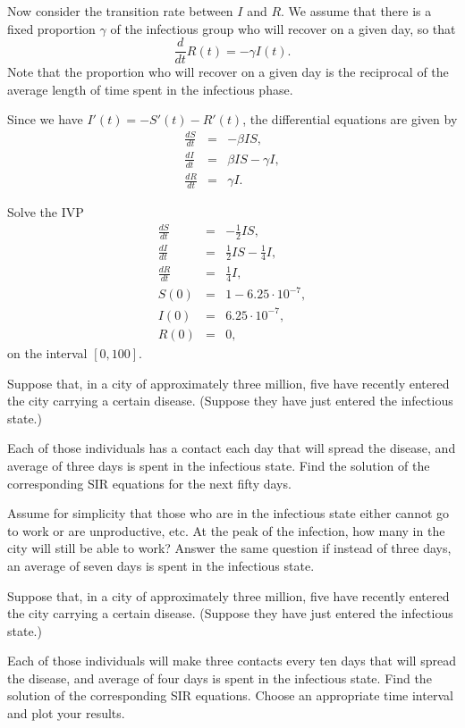  Now consider the transition rate between $I$ and $R$. We assume that there is a fixed proportion $\gamma$ of the infectious group who will recover on a given day, so that 
 \[\frac{d}{dt}R(t) = -\gamma I(t).\]
 Note that the proportion who will recover on a given day is the reciprocal of the average length of time spent in the infectious phase. 
 
 Since we have $I'(t) = - S'(t) - R'(t)$, the  differential equations are given by
\begin{eqnarray*}
\frac{dS}{dt} &=&-\beta IS ,\\
\frac{dI}{dt} &=& \beta I S-\gamma I, \\
\frac{dR}{dt} &=&\gamma I.
\end{eqnarray*}


\begin{problem}
Solve the IVP
\begin{eqnarray*}
\frac{dS}{dt} &=&-\frac{1}{2} IS ,\\
\frac{dI}{dt} &=& \frac{1}{2} I S-\frac{1}{4} I, \\
\frac{dR}{dt} &=&\frac{1}{4} I,\\
S(0) &=& 1-6.25\cdot10^{-7},\\
I(0) &=& 6.25\cdot10^{-7},\\
R(0) &=&0,
\end{eqnarray*}
on the interval $[0,100]$.
\end{problem}


\begin{problem}
Suppose that, in a city of approximately three million, five have recently entered the city carrying a certain disease. (Suppose they have just entered the infectious state.)

Each of those individuals has a contact each day that will spread the disease, and average of three days is spent in the infectious state. Find the solution of the corresponding SIR equations for the next fifty days. 

Assume for simplicity that those who are in the infectious state either cannot go to work or are unproductive, etc. At the peak of the infection, how many in the city will still be able to work? 
Answer the same question if instead of three days, an average of seven days is spent in the infectious state.
\end{problem}


\begin{problem}
Suppose that, in a city of approximately three million, five have recently entered the city carrying a certain disease. (Suppose they have just entered the infectious state.) 

Each of those individuals will make three contacts every ten days that will spread the disease, and average of four days is spent in the infectious state. Find the solution of the corresponding SIR equations. Choose an appropriate time interval and plot your results.
\end{problem}